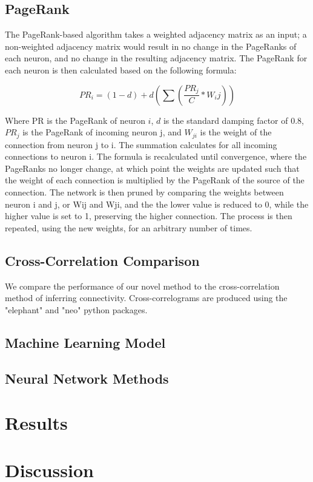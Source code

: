 \documentclass[11pt]{article}
\begin{document}
\subsection{PageRank}
The PageRank-based algorithm takes a weighted adjacency matrix as an input; a non-weighted adjacency matrix would result in no change in the PageRanks of each neuron, and no change in the resulting adjacency matrix. The PageRank for each neuron is then calculated based on the following formula:

$$PR_i = (1-d)+d(\sum(\frac{PR_j}{C} * W_ij))$$

Where PR is the PageRank of neuron $i$, $d$ is the standard damping factor of 0.8, $PR_j$ is the PageRank of incoming neuron j, and $W_{ji}$ is the weight of the connection from neuron j to i. The summation calculates for all incoming connections to neuron i. The formula is recalculated until convergence, where the PageRanks no longer change, at which point the weights are updated such that the weight of each connection is multiplied by the PageRank of the source of the connection. The network is then pruned by comparing the weights between neuron i and j, or Wij and Wji, and the the lower value is reduced to 0, while the higher value is set to 1, preserving the higher connection. The process is then repeated, using the new weights, for an arbitrary number of times.\par

\subsection{Cross-Correlation Comparison}
We compare the performance of our novel method to the cross-correlation method of inferring connectivity. Cross-correlograms are produced using the "elephant" and "neo" python packages.

\subsection{Machine Learning Model}

\subsection{Neural Network Methods}

\section{Results}

\section{Discussion}
\end{document}
